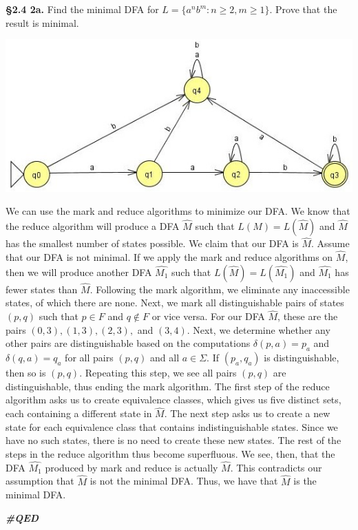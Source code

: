 \documentclass[12pt,letter]{article}
\newcommand{\QED}{
	\begin{flushright}
		\textit{\textbf{\#QED}}
	\end{flushright}
}
\begin{document}
\pagebreak

\textbf{\S 2.4 2a.} Find the minimal DFA for $L = \lbrace a^n b^m : n \geq 2, m \geq 1 \rbrace$. Prove that the result is minimal.

\begin{center}
	\includegraphics{"images/Lab 2 - 2a"}
\end{center}

We can use the mark and reduce algorithms to minimize our DFA. We know that the reduce algorithm will produce a DFA $\widehat{M}$ such that $L(M) = L(\widehat{M})$ and $\widehat{M}$ has the smallest number of states possible. We claim that our DFA is $\widehat{M}$. Assume that our DFA is not minimal. If we apply the mark and reduce algorithms on $\widehat{M}$, then we will produce another DFA $\widehat{M_1}$ such that $L(\widehat{M}) = L(\widehat{M_1})$ and $\widehat{M_1}$ has fewer states than $\widehat{M}$. Following the mark algorithm, we eliminate any inaccessible states, of which there are none. Next, we mark all distinguishable pairs of states $(p, q)$ such that $p \in F$ and $q \not \in F$ or vice versa. For our DFA $\widehat{M}$, these are the pairs $(0, 3), (1, 3), (2, 3),$ and $(3, 4)$. Next, we determine whether any other pairs are distinguishable based on the computations $\delta (p, a) = p_a$ and $\delta (q, a) = q_a$ for all pairs $(p, q)$ and all $a \in \Sigma$. If $(p_a, q_a)$ is distinguishable, then so is $(p, q)$. Repeating this step, we see all pairs $(p, q)$ are distinguishable, thus ending the mark algorithm. The first step of the reduce algorithm asks us to create equivalence classes, which gives us five distinct sets, each containing a different state in $\widehat{M}$. The next step asks us to create a new state for each equivalence class that contains indistinguishable states. Since we have no such states, there is no need to create these new states. The rest of the steps in the reduce algorithm thus become superfluous. We see, then, that the DFA $\widehat{M_1}$ produced by mark and reduce is actually $\widehat{M}$. This contradicts our assumption that $\widehat{M}$ is not the minimal DFA. Thus, we have  that $\widehat{M}$ is the minimal DFA. \QED
\end{document}
